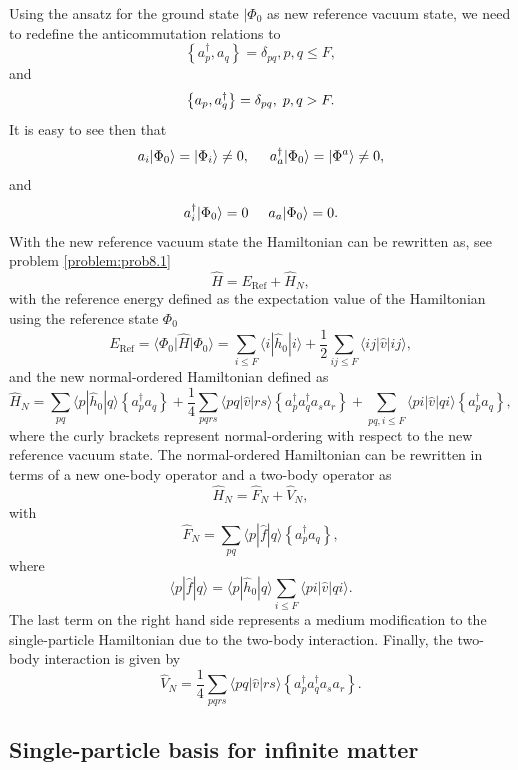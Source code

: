Using the ansatz for the ground state $\vert \Phi_0$ as new reference vacuum state, we need to redefine the anticommutation relations to
\[
\left\{a_p^\dagger, a_q \right\}= \delta_{pq}, p, q \leq F, 
\]
and
\[
\left\{a_p, a_q^\dagger \right\} = \delta_{pq}, \hspace{0.1cm} p, q > F.
\]
It is easy to see then that         
\[
        a_i|\Phi_0\rangle = |\Phi_i\rangle\ne 0, \hspace{0.5cm} a_a^\dagger|\Phi_0\rangle = |\Phi^a\rangle\ne 0,
\]
and         
\[
a_i^\dagger|\Phi_0\rangle = 0 \hspace{0.5cm}  a_a|\Phi_0\rangle = 0.
\]
With the new reference vacuum state the Hamiltonian can be rewritten as, see problem \ref{problem:prob8.1} 
\[
\hat{H}=E_{\mathrm{Ref}}+\hat{H}_N,
\]
with the reference energy defined as the expectation value of the Hamiltonian using the reference state $\Phi_0$
\[
E_{\mathrm{Ref}}=\langle \Phi_0 \vert \hat{H} \vert \Phi_0\rangle = \sum_{i\le F} \langle i|\hat{h}_0|i\rangle + \frac{1}{2} \sum_{ij\le F}\langle ij|\hat{v}|ij\rangle,
\]
and the new normal-ordered Hamiltonian defined as 
\[
\hat{H}_N = \sum_{pq} \langle p|\hat{h}_0|q\rangle \left\{a^\dagger_p a_q\right\}+\frac{1}{4} \sum_{pqrs} \langle pq|\hat{v}|rs\rangle \left\{a^\dagger_p a^\dagger_q a_s  a_r\right\}+\sum_{pq,i\le F} \langle pi|\hat{v}|qi\rangle \left\{a^\dagger_p a_q\right\},  
\]
where the curly brackets represent normal-ordering with respect to the new reference vacuum state. 
The normal-ordered Hamiltonian can be rewritten in terms of a new one-body operator and a two-body operator as
\[
\hat{H}_N=\hat{F}_N+\hat{V}_N,
\]
with
\[
\hat{F}_N=\sum_{pq} \langle p|\hat{f}|q\rangle \left\{a^\dagger_p a_q\right\},
\]
where
\[
\langle p|\hat{f}|q\rangle= \langle p|\hat{h}_0|q\rangle \sum_{i\le F} \langle pi|\hat{v}|qi\rangle.  
\]
The last term on the right hand side  represents a medium modification to the single-particle Hamiltonian  due to the two-body interaction.
Finally, the two-body interaction is given by
\[	     
\hat{V}_N = \frac{1}{4} \sum_{pqrs} \langle pq|\hat{v}|rs\rangle \left\{a^\dagger_p a^\dagger_q a_s  a_r\right\}.
\]

\subsection{Single-particle basis for infinite matter}

